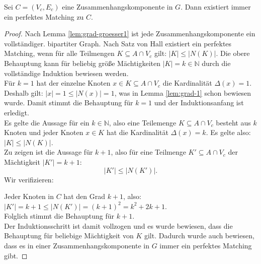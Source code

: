 \begin{lemma}\label{lem:komponente-matching}
Sei $C = (V_c, E_c)$ eine
Zusammenhangskomponente in $G$. Dann existiert immer ein perfektes Matching zu $C$.
\end{lemma}
\begin{proof} 
Nach Lemma \ref{lem:grad-groesser1} ist jede Zusammenhangskomponente ein vollständiger.
bipartiter Graph. Nach Satz von Hall existiert ein perfektes Matching, wenn
für alle Teilmengen $K \subseteq A \cap V_c$ gilt: $|K| \leqslant |N(K)|$.
Die obere Behauptung kann für beliebig größe Mächtigkeiten $|K| = k \in \mathbb{N}$
durch die vollständige Induktion bewiesen werden.\\

\noindent
{} Für $k = 1$ hat der einzelne Knoten $x \in K \subseteq A \cap V_c$
die Kardinalität $\Delta(x) = 1$.
Deshalb gilt: $|x| = 1 \leqslant |N(x)| = 1$, was in Lemma \ref{lem:grad-1} 
schon bewiesen wurde. Damit stimmt die Behauptung für $k = 1$ und der Induktionsanfang ist erledigt.\\

\noindent
{} Es gelte die Aussage für ein $k \in \mathbb{N}$, also eine Teilemenge
$K \subseteq A \cap V_c$ besteht aus $k$ Knoten und jeder Knoten $x \in K$ hat die Kardinalität
$\Delta(x) = k$. Es gelte also: $|K| \leqslant |N(K)|$.\\
Zu zeigen ist die Aussage für $k + 1$, also für eine Teilmenge $K' \subseteq A \cap V_c$ der Mächtigkeit 
$|K'| = k+1$:
\[
|K'| \leqslant |N(K')|.
\] 
Wir verifizieren:

Jeder Knoten in $C$ hat den Grad $k+1$, also: $|K'| = k + 1 \leqslant |N(K')| = (k+1)^2 = k^2 + 2k + 1$.\\
Folglich stimmt die Behauptung für $k+1$.\\

Der Induktionsschritt ist damit vollzogen und es wurde bewiesen, dass die Behauptung für beliebige
Mächtigkeit von $K$ gilt.
Dadurch wurde auch bewiesen, dass es in einer Zusammenhangskomponente in $G$
 immer ein perfektes Matching gibt.
\end{proof}

